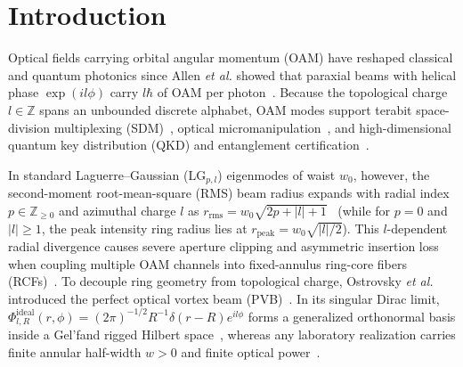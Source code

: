 \documentclass[aps,pra,onecolumn,notitlepage,11pt,tightenlines,amsmath,amssymb,floatfix,longbibliography]{revtex4-2}
\providecommand{\abs}[1]{\lvert#1\rvert}
\begin{document}
\section{Introduction}
\label{sec:intro}

Optical fields carrying orbital angular momentum (OAM) have reshaped classical and quantum photonics since Allen \emph{et al.} showed that paraxial beams with helical phase $\exp(il\phi)$ carry $l\hbar$ of OAM per photon~\cite{Allen1992}. Because the topological charge $l \in \mathbb{Z}$ spans an unbounded discrete alphabet, OAM modes support terabit space-division multiplexing (SDM)~\cite{Bozinovic2013,Willner2015,Wang2019}, optical micromanipulation~\cite{Padgett2011}, and high-dimensional quantum key distribution (QKD) and entanglement certification~\cite{Cerf2002,Mirhosseini2015,Bavaresco2018,Erhard2018}.

In standard Laguerre--Gaussian ($\mathrm{LG}_{p,l}$) eigenmodes of waist $w_0$, however, the second-moment root-mean-square (RMS) beam radius expands with radial index $p \in \mathbb{Z}_{\ge 0}$ and azimuthal charge $l$ as $r_{\mathrm{rms}} = w_0\sqrt{2p+\abs{l}+1}$~\cite{Allen1992,Siegman1986} (while for $p = 0$ and $\abs{l} \ge 1$, the peak intensity ring radius lies at $r_{\mathrm{peak}} = w_0\sqrt{\abs{l}/2}$). This $l$-dependent radial divergence causes severe aperture clipping and asymmetric insertion loss when coupling multiple OAM channels into fixed-annulus ring-core fibers (RCFs)~\cite{Ramachandran2009,Brunet2014,Gregg2015,Canas2021,RojasRojas2021,Villalba2023}. To decouple ring geometry from topological charge, Ostrovsky \emph{et al.} introduced the perfect optical vortex beam (PVB)~\cite{Ostrovsky2013,Vaity2015}. In its singular Dirac limit, $\Phi_{l,R}^{\mathrm{ideal}}(r,\phi) = (2\pi)^{-1/2} R^{-1}\delta(r-R)e^{il\phi}$ forms a generalized orthonormal basis inside a Gel'fand rigged Hilbert space~\cite{Gelfand1964}, whereas any laboratory realization carries finite annular half-width $w > 0$ and finite optical power~\cite{Vaity2015,Reddy2016}.
\end{document}
